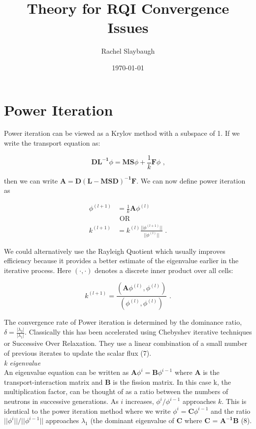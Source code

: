 \documentclass[12pt,twoside]{book}
\date{\today}
\title{Theory for RQI Convergence Issues}
\author{Rachel Slaybaugh}
\begin{document}
\maketitle

\section{Power Iteration}

Power iteration can be viewed as a Krylov method with a subspace of 1. If we write the transport equation as:

\begin{equation}
  \mathbf{DL^{-1}}\phi = \mathbf{MS}\phi + \frac{1}{k}\mathbf{F}\phi \text{ ,}
\end{equation}

then we can write $\mathbf{A }= \mathbf{D(L - MSD)^{-1}F}$. We can now define power iteration as

\begin{align}
  \phi^{(l+1)} &= \frac{1}{k}\mathbf{A}\phi^{(l)}  \\
  &\text{ OR} \nonumber \\
  k^{(l+1)} &= k^{(l)}\frac{||\phi^{(l+1)}||}{||\phi^{(l)}||} \text{ .}
\end{align}

We could alternatively use the Rayleigh Quotient which usually improves efficiency because it provides a better estimate of the eigenvalue earlier in the iterative process. Here $(\cdot , \cdot)$ denotes a discrete inner product over all cells:

\begin{equation}
  k^{(l+1)} = \frac{(\mathbf{A}\phi^{(l)}, \phi^{(l)})}{(\phi^{(l)}, \phi^{(l)})} \text{ .}
\end{equation}

The convergence rate of Power iteration is determined by the dominance ratio, $\delta = \frac{|\lambda_{2}|}{|\lambda_{1}|}$. Classically this has been accelerated using Chebyshev iterative techniques or Successive Over Relaxation. They use a linear combination of a small number of previous iterates to update the scalar flux (7).\\

\emph{k eigenvalue}\\
An eigenvalue equation can be written as $\mathbf{A} \phi^{i} =  \mathbf{B} \phi^{i-1}$ where $\mathbf{A}$ is the transport-interaction matrix and $\mathbf{B}$ is the fission matrix. In this case k, the multiplication factor, can be thought of as a ratio between the numbers of neutrons in successive generations. As $i$ increases, $\phi^{i}/\phi^{i-1}$ approaches $k$. This is identical to the power iteration method where we write $\phi^{i} = \mathbf{C}\phi^{i-1}$ and the ratio $||\phi^{i}||/||\phi^{i-1}||$ approaches $\lambda_{1}$ (the dominant eigenvalue of $\mathbf{C}$ where $\mathbf{C}$ = $\mathbf{A^{-1}B}$ (8). 
\end{document}
